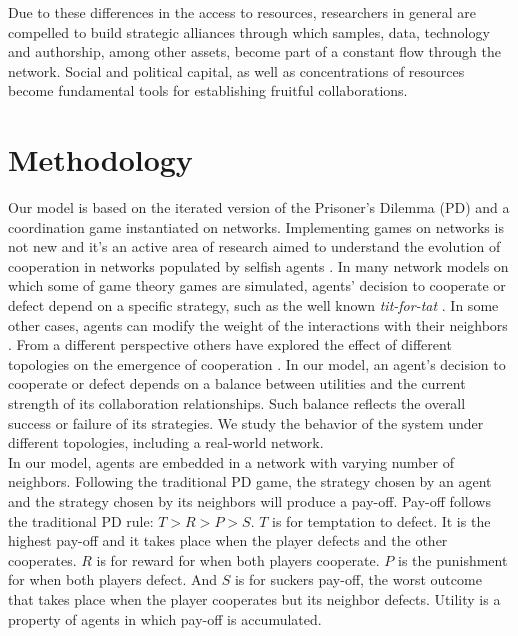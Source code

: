 \documentclass[11pt]{article}
\begin{document}
Due to these differences in the access to resources, researchers in
general are compelled to build strategic alliances through which samples, data,
technology and authorship, among other assets, become part of a constant flow through
the network. Social and political capital, as well as concentrations of
resources become fundamental tools for establishing fruitful collaborations. 

\section{Methodology}
\label{sec:2}

Our model is based on the iterated version of the Prisoner's Dilemma (PD) and a
coordination game instantiated on
networks. Implementing games on networks is not new and it's an active area of
research aimed to understand the evolution of cooperation in networks populated
by selfish agents \cite{Szabo2007,Nowak1992,Nowak2006,Santos2005,Santos2006}. In many network models
on which some of game theory games are simulated, agents' decision to cooperate
or defect depend on a specific strategy, such as the well known
\textit{tit-for-tat} \cite{Axelrod2006,Nowak2011}. In some other cases, agents
can modify the weight of the interactions with their neighbors
\cite{Santos2006}. From a different perspective others have explored the effect
of different topologies on the emergence of cooperation
\cite{Santos2005,Hauert2004}. In our model, an agent's decision to cooperate or
defect depends on a balance between
utilities and the current strength of its collaboration relationships. Such
balance reflects the overall success or failure of its strategies. We
study the behavior of the system under different topologies, including a
real-world network.\\  


In our model, agents are embedded in a network with varying number of
neighbors. Following the traditional PD game, the strategy chosen by an agent
and the strategy chosen by its neighbors will produce a pay-off. Pay-off follows
the traditional PD rule: $T > R > P > S$. $T$ is for temptation to defect. It is the highest
pay-off and it takes place when the player defects and the other cooperates. $R$
is for reward for when both players cooperate. $P$ is the punishment for when
both players defect. And $S$ is for suckers pay-off, the worst outcome that
takes place when the player cooperates but its neighbor defects. Utility is a
property of agents in which pay-off is accumulated.\\   
\end{document}
